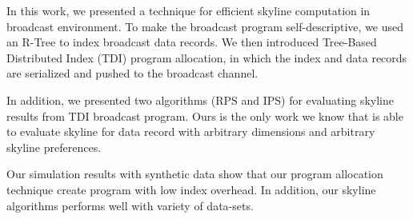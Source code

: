 In this work, we presented a technique for efficient skyline computation in broadcast environment. To make the broadcast program self-descriptive, we used an R-Tree to index broadcast data records. We then introduced Tree-Based Distributed Index (TDI) program allocation, in which the index and data records are serialized and pushed to the broadcast channel.

In addition, we presented two algorithms (RPS and IPS) for evaluating skyline results from TDI broadcast program. Ours is the only work we know that is able to evaluate skyline for data record with arbitrary dimensions and arbitrary skyline preferences.

Our simulation results with synthetic data show that our program allocation technique create program with low index overhead. In addition, our skyline algorithms performs well with variety of data-sets.



